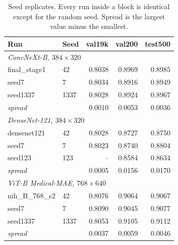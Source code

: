 
\begin{table}[H]
  \caption{Seed replicates. Every run inside a block is identical except for the
  random seed. Spread is the largest value minus the smallest.}
  \centering
  \footnotesize
  \begin{tabular}{llrrr}
    \toprule
    Run & Seed & val19k & val200 & test500 \\
    \midrule
    \multicolumn{5}{l}{\textit{ConvNeXt-B, $384\times320$}} \\
    final\_stage1 & 42 & 0.8038 & 0.8969 & 0.8985 \\
    seed7 & 7 & 0.8034 & 0.8916 & 0.8949 \\
    seed1337 & 1337 & 0.8028 & 0.8924 & 0.8967 \\
    \multicolumn{2}{l}{\textit{spread}} & 0.0010 & 0.0053 & 0.0036 \\
    \midrule
    \multicolumn{5}{l}{\textit{DenseNet-121, $384\times320$}} \\
    densenet121 & 42 & 0.8028 & 0.8727 & 0.8750 \\
    seed7 & 7 & 0.8023 & 0.8740 & 0.8804 \\
    seed123 & 123 & -- & 0.8584 & 0.8634 \\
    \multicolumn{2}{l}{\textit{spread}} & 0.0005 & 0.0156 & 0.0170 \\
    \midrule
    \multicolumn{5}{l}{\textit{ViT-B Medical-MAE, $768\times640$}} \\
    nih\_B\_768\_s2 & 42 & 0.8076 & 0.9064 & 0.9067 \\
    seed7 & 7 & 0.8090 & 0.9045 & 0.9077 \\
    seed1337 & 1337 & 0.8053 & 0.9105 & 0.9112 \\
    \multicolumn{2}{l}{\textit{spread}} & 0.0037 & 0.0059 & 0.0046 \\
    \bottomrule
  \end{tabular}
  \label{tab:seeds}
\end{table}
